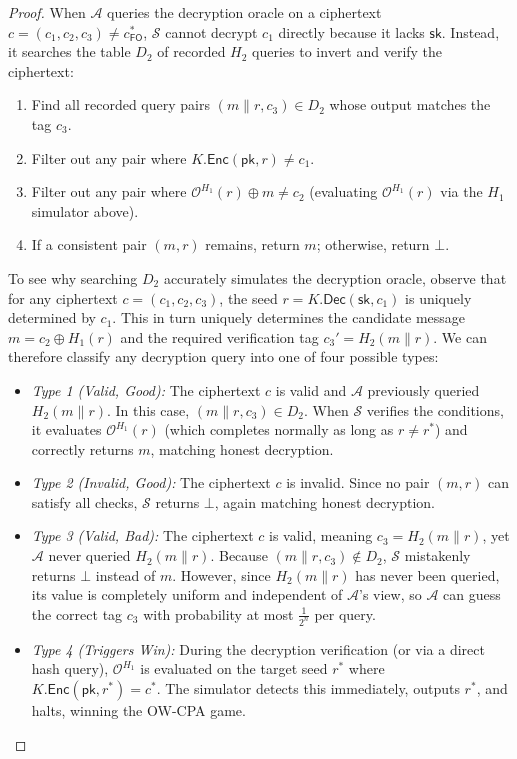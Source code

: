 \begin{proof}
    When \(\mathcal{A}\) queries the decryption oracle on a ciphertext \(c = (c_1, c_2, c_3) \neq c_{\mathsf{FO}}^*\), \(\mathcal{S}\) cannot decrypt \(c_1\) directly because it lacks \(\mathsf{sk}\).
    Instead, it searches the table \(D_2\) of recorded \(H_2\) queries to invert and verify the ciphertext:
    \begin{enumerate}
        \item Find all recorded query pairs \((m \parallel r, c_3) \in D_2\) whose output matches the tag \(c_3\).
        \item Filter out any pair where \(K.\mathsf{Enc}(\mathsf{pk}, r) \neq c_1\).
        \item Filter out any pair where \(\mathcal{O}^{H_1}(r) \oplus m \neq c_2\) (evaluating \(\mathcal{O}^{H_1}(r)\) via the \(H_1\) simulator above).
        \item If a consistent pair \((m, r)\) remains, return \(m\); otherwise, return \(\bot\).
    \end{enumerate}

    To see why searching \(D_2\) accurately simulates the decryption oracle, observe that for any ciphertext \(c = (c_1, c_2, c_3)\), the seed \(r = K.\mathsf{Dec}(\mathsf{sk}, c_1)\) is uniquely determined by \(c_1\). This in turn uniquely determines the candidate message \(m = c_2 \oplus H_1(r)\) and the required verification tag \(c_3' = H_2(m \parallel r)\).
    We can therefore classify any decryption query into one of four possible types:
    \begin{itemize}
        \item \emph{Type 1 (Valid, Good):} The ciphertext \(c\) is valid and \(\mathcal{A}\) previously queried \(H_2(m \parallel r)\). In this case, \((m \parallel r, c_3) \in D_2\). When \(\mathcal{S}\) verifies the conditions, it evaluates \(\mathcal{O}^{H_1}(r)\) (which completes normally as long as \(r \neq r^*\)) and correctly returns \(m\), matching honest decryption.
        \item \emph{Type 2 (Invalid, Good):} The ciphertext \(c\) is invalid. Since no pair \((m, r)\) can satisfy all checks, \(\mathcal{S}\) returns \(\bot\), again matching honest decryption.
        \item \emph{Type 3 (Valid, Bad):} The ciphertext \(c\) is valid, meaning \(c_3 = H_2(m \parallel r)\), yet \(\mathcal{A}\) never queried \(H_2(m \parallel r)\). Because \((m \parallel r, c_3) \notin D_2\), \(\mathcal{S}\) mistakenly returns \(\bot\) instead of \(m\). However, since \(H_2(m \parallel r)\) has never been queried, its value is completely uniform and independent of \(\mathcal{A}\)'s view, so \(\mathcal{A}\) can guess the correct tag \(c_3\) with probability at most \(\frac{1}{2^n}\) per query.
        \item \emph{Type 4 (Triggers Win):} During the decryption verification (or via a direct hash query), \(\mathcal{O}^{H_1}\) is evaluated on the target seed \(r^*\) where \(K.\mathsf{Enc}(\mathsf{pk}, r^*) = c^*\). The simulator detects this immediately, outputs \(r^*\), and halts, winning the OW-CPA game.
    \end{itemize}


\end{proof}
